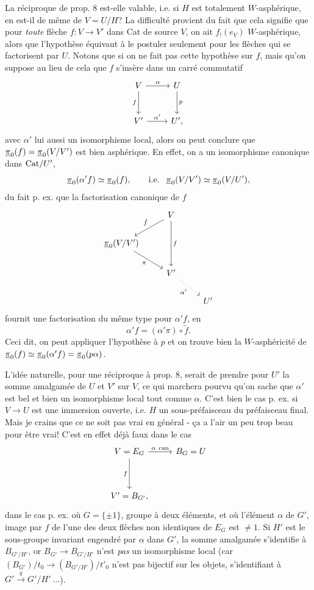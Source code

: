 La réciproque de prop. 8 est-elle valable, i.e. si $H$ est totalement $W$-asphérique, en est-il de même de $V = U/H$? La difficulté provient du fait que cela signifie que pour \textit{toute} flèche $f : V \longrightarrow V'$ dans Cat de source $V$, on ait $f_!(e_V)$ $W$-asphérique, alors que l'hypothèse équivaut à le postuler seulement pour les flèches qui se factorisent par $U$. Notons que si on ne fait pas cette hypothèse sur $f$, mais qu'on suppose au lieu de cela que $f$ s'insère dans un carré commutatif 
\[
\begin{tikzcd}[row sep=large]
V \arrow[r, "\alpha"] \arrow[d, "f"'] & U \arrow[d, "p"] \\
V' \arrow[r, "\alpha'"] & U',
\end{tikzcd}
\]
avec $\alpha'$ lui aussi un isomorphisme local, alors on peut conclure que $\underline{\pi}_0(f) = \underline{\pi}_0(V/V')$ est bien asphérique. En effet, on a un isomorphisme canonique dans $\mathrm{Cat}/U'$,
\[ \underline{\pi}_0(\alpha'f) \simeq \underline{\pi}_0(f), \qquad \text{i.e. } \ \underline{\pi}_0(V/V') \simeq \underline{\pi}_0(V/U'), \]
du fait p. ex. que la factorisation canonique de $f$
\[
\begin{tikzcd}[row sep=normal]
 & V \arrow[dl, "\tilde{f}"'] \arrow[dd, "f"] & \\
\upi_0(V/V') \arrow[dr, "\pi"'] & & \\
 & V' \arrow[dr, dotted, "\alpha'"'] & \\
 & & U'
\end{tikzcd}
\]
fournit une factorisation du même type pour $\alpha'f$, en
\[ \alpha'f = (\alpha'\pi) \circ \tilde{f}. \]
Ceci dit, on peut appliquer l'hypothèse à $p$ et on trouve bien la $W$-asphéricité de $\underline{\pi}_0(f) \simeq \underline{\pi}_0(\alpha'f) = \underline{\pi}_0(p\alpha)$.

L'idée naturelle, pour une réciproque à prop. 8, serait de prendre pour $U'$ la somme amalgamée de $U$ et $V'$ sur $V$, ce qui marchera pourvu qu'on sache que $\alpha'$ est bel et bien un isomorphisme local tout comme $\alpha$. C'est bien le cas p. ex. si $V \longrightarrow U$ est une immersion ouverte, i.e. $H$ un sous-préfaisceau du préfaisceau final. Mais je crains que ce ne soit pas vrai en général - ça a l'air un peu trop beau pour être vrai! C'est en effet déjà faux dans le cas
\[
\begin{tikzcd}[row sep=huge]
V = E_G \arrow[r, "\alpha\ \text{can}"] \arrow[d, "f"'] & B_G = U \\
V' = B_{G'}, &
\end{tikzcd}
\]
dans le cas p. ex. où $G = \{\pm 1\}$, groupe à deux éléments, et où l'élément $\alpha$ de $G'$, image par $f$ de l'une des deux flèches non identiques de $E_G$ est $\neq 1$. Si $H'$ est le sous-groupe invariant engendré par $\alpha$ dans $G'$, la somme amalgamée s'identifie à $B_{G'/H'}$, or $B_{G'} \longrightarrow B_{G'/H'}$ n'est \textit{pas} un isomorphisme local (car $(B_{G'})/t_0 \longrightarrow (B_{G'/H'})/t'_0$ n'est pas bijectif sur les objets, s'identifiant à $G' \overset{q}{\longrightarrow} G'/H' \ \ldots$).

